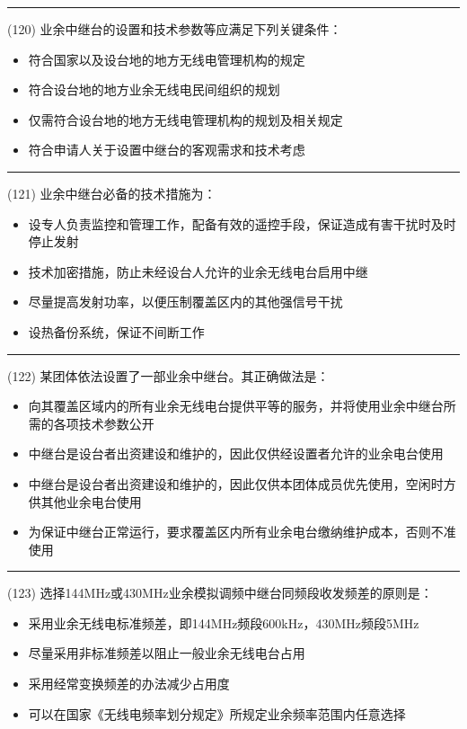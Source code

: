 \documentclass[twocolumn]{ctexart}  %
\begin{document}
\noindent\rule{0.5\textwidth}{1pt}
\heiti (120) 业余中继台的设置和技术参数等应满足下列关键条件： \songti {\color{gray} [LK0034] }
\begin{itemize}
	\item  符合国家以及设台地的地方无线电管理机构的规定
	\item  符合设台地的地方业余无线电民间组织的规划
	\item  仅需符合设台地的地方无线电管理机构的规划及相关规定
	\item  符合申请人关于设置中继台的客观需求和技术考虑
\end{itemize}


\noindent\rule{0.5\textwidth}{1pt}
\heiti (121) 业余中继台必备的技术措施为： \songti {\color{gray} [LK0035] }
\begin{itemize}
	\item  设专人负责监控和管理工作，配备有效的遥控手段，保证造成有害干扰时及时停止发射
	\item  技术加密措施，防止未经设台人允许的业余无线电台启用中继
	\item  尽量提高发射功率，以便压制覆盖区内的其他强信号干扰
	\item  设热备份系统，保证不间断工作
\end{itemize}


\noindent\rule{0.5\textwidth}{1pt}
\heiti (122) 某团体依法设置了一部业余中继台。其正确做法是： \songti {\color{gray} [LK0036] }
\begin{itemize}
	\item  向其覆盖区域内的所有业余无线电台提供平等的服务，并将使用业余中继台所需的各项技术参数公开
	\item  中继台是设台者出资建设和维护的，因此仅供经设置者允许的业余电台使用
	\item  中继台是设台者出资建设和维护的，因此仅供本团体成员优先使用，空闲时方供其他业余电台使用
	\item  为保证中继台正常运行，要求覆盖区内所有业余电台缴纳维护成本，否则不准使用
\end{itemize}


\noindent\rule{0.5\textwidth}{1pt}
\heiti (123) 选择144MHz或430MHz业余模拟调频中继台同频段收发频差的原则是： \songti {\color{gray} [LK0037] }
\begin{itemize}
	\item  采用业余无线电标准频差，即144MHz频段600kHz，430MHz频段5MHz
	\item  尽量采用非标准频差以阻止一般业余无线电台占用
	\item  采用经常变换频差的办法减少占用度
	\item  可以在国家《无线电频率划分规定》所规定业余频率范围内任意选择
\end{itemize}
\end{document}
